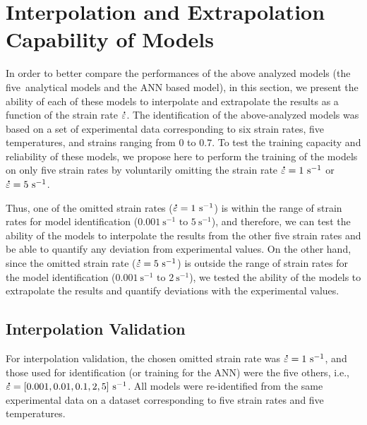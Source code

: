 \documentclass[metals,article,accept,pdftex,moreauthors]{Definitions/mdpi}
\makeatletter
\DeclareRobustCommand{\mdot}[1]{\accentset{\mbox{\bfseries .}}{#1}}
\DeclareRobustCommand{\ie}{i.e.,\@\xspace}
\DeclareRobustCommand{\ps}{\text{s}^{-1}}
\makeatother
\begin{document}
\section{Interpolation and Extrapolation Capability of Models\label{sec:IntExt}}

In order to better compare the performances of the above analyzed models (the five~analytical models and the ANN based model), in this section, we present the ability of each of these models to interpolate and extrapolate the results as a function of the strain rate $\mdot\varepsilon$.
The identification of the above-analyzed models was based on a set of experimental data corresponding to six strain rates, five temperatures, and strains ranging from $0$ to $0.7$.
To test the training capacity and reliability of these models, we propose here to perform the training of the models on only five strain rates by voluntarily omitting the strain rate $\mdot\varepsilon=1~\ps$ or $\mdot\varepsilon=5~\ps$.

Thus, one of the omitted strain rates ($\mdot\varepsilon=1~\ps$) is within the range of strain rates for model identification ($0.001~\ps\text{ to }5~\ps$), and therefore, we can test the ability of the models to interpolate the results from the other five strain rates and be able to quantify any deviation from experimental values.
On the other hand, since the omitted strain rate ($\mdot\varepsilon=5~\ps$) is outside the range of strain rates for the model identification ($0.001~\ps\text{ to }2~\ps$), we tested the ability of the models to extrapolate the results and quantify deviations with the experimental values.

\subsection{Interpolation Validation}

For interpolation validation, the chosen omitted strain rate was $\mdot\varepsilon=1~\ps$, and \linebreak those used for identification (or training for the ANN) were the five others, \ie \linebreak \mbox{$\mdot\varepsilon=[0.001, 0.01, 0.1, 2, 5]~\ps$}.
All models were re-identified from the same experimental data on a dataset corresponding to five strain rates and five temperatures.
\end{document}
